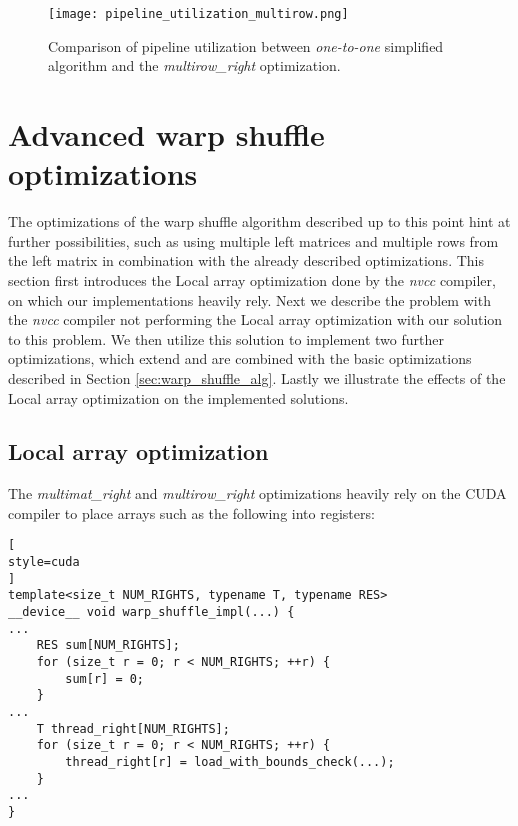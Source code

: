 \begin{figure}[ht]
	\centering
	\texttt{[image: pipeline\_utilization\_multirow.png]}
	\caption{Comparison of pipeline utilization between \textit{one-to-one} simplified algorithm and the \textit{multirow\_right} optimization.}
	\label{fig:pipeline_utilization_multirow}
\end{figure}



\section{Advanced warp shuffle optimizations}

The optimizations of the warp shuffle algorithm described up to this point hint at further possibilities, such as using multiple left matrices and multiple rows from the left matrix in combination with the already described optimizations. This section first introduces the Local array optimization done by the \textit{nvcc} compiler, on which our implementations heavily rely. Next we describe the problem with the \textit{nvcc} compiler not performing the Local array optimization with our solution to this problem. We then utilize this solution to implement two further optimizations, which extend and are combined with the basic optimizations described in Section \ref{sec:warp_shuffle_alg}. Lastly we illustrate the effects of the Local array optimization on the implemented solutions.


\subsection{Local array optimization}
\label{sec:local_array_optimization}

The \textit{multimat\_right} and \textit{multirow\_right} optimizations heavily rely on the CUDA compiler to place arrays such as the following into registers:

\begin{lstlisting}[
style=cuda
]
template<size_t NUM_RIGHTS, typename T, typename RES>
__device__ void warp_shuffle_impl(...) {
...
	RES sum[NUM_RIGHTS];
	for (size_t r = 0; r < NUM_RIGHTS; ++r) {
		sum[r] = 0;
	}
...
	T thread_right[NUM_RIGHTS];
	for (size_t r = 0; r < NUM_RIGHTS; ++r) {
		thread_right[r] = load_with_bounds_check(...);
	}
...
}
\end{lstlisting}

